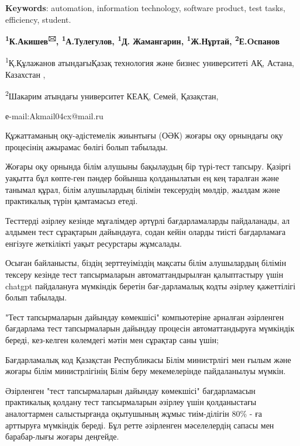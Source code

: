 {\bfseries Keywords}: automation, information technology, software
product, test tasks, efficiency, student.




\begin{center}
{\bfseries \textsuperscript{1}К.Акишев\textsuperscript{🖂},
\textsuperscript{1}А.Тулегулов, \textsuperscript{1}Д. Жамангарин,
\textsuperscript{1}Ж.Нұртай, \textsuperscript{2}Е.Oспанов}

\textsuperscript{1}Қ.Құлажанов атындағыҚазақ технология және бизнес
университеті АҚ, Астана, Казахстан ,

\textsuperscript{2}Шакарим атындағы университет КЕАҚ, Семей, Қазақстан,

е-mail:Akmail04cx@mail.ru
\end{center}

Құжаттаманың оқу-әдістемелік жиынтығы (ОӘК) жоғары оқу орнындағы оқу
процесінің ажырамас бөлігі болып табылады.

Жоғары оқу орнында білім алушыны бақылаудың бір түрі-тест тапсыру.
Қазіргі уақытта бұл көпте-ген пәндер бойынша қолданылатын ең кең таралған
және танымал құрал, білім алушылардың білімін тексерудің мөлдір, жылдам
және практикалық түрін қамтамасыз етеді.

Тесттерді әзірлеу кезінде мұғалімдер әртүрлі бағдарламаларды
пайдаланады, ал алдымен тест сұрақтарын дайындауға, содан кейін оларды
тиісті бағдарламаға енгізуге жеткілікті уақыт ресурстары жұмсалады.

Осыған байланысты, біздің зерттеуіміздің мақсаты білім алушылардың
білімін тексеру кезінде тест тапсырмаларын автоматтандырылған
қалыптастыру үшін chatgpt пайдалануға мүмкіндік беретін бағ-дарламалық
кодты әзірлеу қажеттілігі болып табылады.

"Тест тапсырмаларын дайындау көмекшісі" компьютеріне арналған әзірленген
бағдарлама тест тапсырмаларын дайындау процесін автоматтандыруға
мүмкіндік береді, кез-келген көлемдегі мәтін мен сұрақтар саны үшін;

Бағдарламалық код Қазақстан Республикасы Білім министрлігі мен ғылым
және жоғары білім министрлігінің Білім беру мекемелерінде пайдаланылуы
мүмкін.

Әзірленген "тест тапсырмаларын дайындау көмекшісі" бағдарламасын
практикалық қолдану тест тапсырмаларын әзірлеу үшін қолданыстағы
аналогтармен салыстырғанда оқытушының жұмыс тиім-ділігін 80\% - ға
арттыруға мүмкіндік береді. Бұл ретте әзірленген мәселелердің сапасы мен
барабар-лығы жоғары деңгейде.

